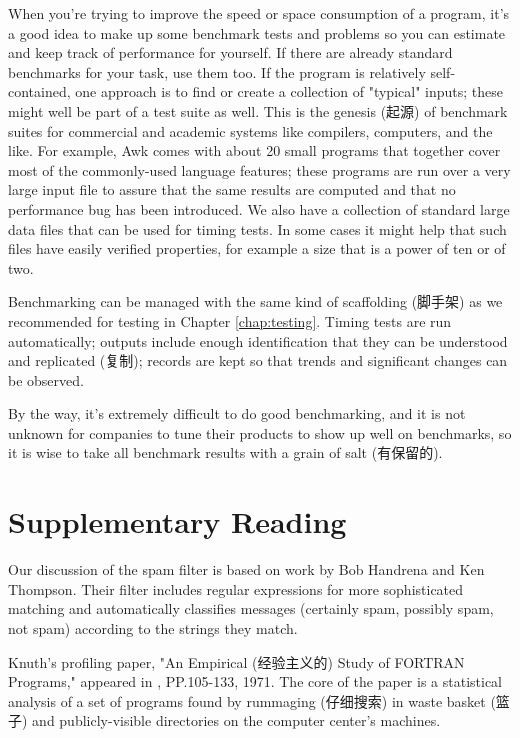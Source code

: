 When you're trying to improve the speed or space consumption of a program,
it's a good idea to make up some benchmark tests and problems so you can
estimate and keep track of performance for yourself. If there are already
standard benchmarks for your task, use them too. If the program is
relatively self-contained, one approach is to find or create a collection
of "typical" inputs; these might well be part of a test suite as well. This
is the genesis (起源) of benchmark suites for commercial and academic
systems like compilers, computers, and the like. For example, Awk comes
with about 20 small programs that together cover most of the commonly-used
language features; these programs are run over a very large input file to
assure that the same results are computed and that no performance bug has
been introduced. We also have a collection of standard large data files
that can be used for timing tests. In some cases it might help that such
files have easily verified properties, for example a size that is a power
of ten or of two.

Benchmarking can be managed with the same kind of scaffolding (脚手架) as
we recommended for testing in Chapter \ref{chap:testing}. Timing tests are
run automatically; outputs include enough identification that they can be
understood and replicated (复制); records are kept so that trends and
significant changes can be observed.

By the way, it's extremely difficult to do good benchmarking, and it is not
unknown for companies to tune their products to show up well on benchmarks,
so it is wise to take all benchmark results with a grain of salt
(有保留的).

\section*{Supplementary Reading}
Our discussion of the spam filter is based on work by Bob Handrena and Ken
Thompson. Their filter includes regular expressions for more sophisticated
matching and automatically classifies messages (certainly spam, possibly
spam, not spam) according to the strings they match.

Knuth's profiling paper, "An Empirical (经验主义的) Study of FORTRAN
Programs," appeared in ,
PP.105-133, 1971. The core of the paper is a statistical analysis of a set
of programs found by rummaging (仔细搜索) in waste basket (篮子) and
publicly-visible directories on the computer center's machines.

